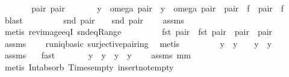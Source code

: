 \begin{isabellebody}
\ \ \ \ \isamarkupfalse%
\ \isamarkupfalse%
\ pair{}\ pair{}\ \ \isanewline
\ \ \ \ {}{\isacharcolon}\ {\isachardoublequoteopen}y{}\ {\isacharequal}\ omega\ pair{}\ {\isacharampersand}\ y{}\ {\isacharequal}\ omega\ pair{}\ {\isacharampersand}\ pair{}\ {\isasymin}\ f\ {\isacharampersand}\ pair{}\ {\isasymin}\ f{\isachardoublequoteclose}\ \isamarkupfalse%
\ blast\isanewline
\ \ \ \ \isamarkupfalse%
\ \isamarkupfalse%
\ \isamarkupfalse%
\ {\isachardoublequoteopen}snd\ pair{}\ {\isasymnoteq}\ {\isacharbraceleft}{\isacharbraceright}\ {\isacharampersand}\ snd\ pair{}\ {\isasymnoteq}\ {\isacharbraceleft}{\isacharbraceright}{\isachardoublequoteclose}\ \isamarkupfalse%
\ assms\isanewline
{}\isamarkupfalse%
\ {\isacharparenleft}metis\ rev{\isacharunderscore}image{\isacharunderscore}eqI\ snd{\isacharunderscore}eq{\isacharunderscore}Range{\isacharparenright}\isanewline
\ \ \ \ \isamarkupfalse%
\ \isamarkupfalse%
\ \isamarkupfalse%
\ {\isachardoublequoteopen}fst\ pair{}\ {\isacharequal}\ fst\ pair{}\ {\isasymlongleftrightarrow}\ pair{}\ {\isacharequal}\ pair{}{\isachardoublequoteclose}\ \isamarkupfalse%
\ assms\isanewline
\ \ \ \ runiq{\isacharunderscore}basic\ surjective{\isacharunderscore}pairing\ \isamarkupfalse%
\ metis\isanewline
\ \ \ \ \isamarkupfalse%
\ \isamarkupfalse%
\ \isamarkupfalse%
\ {\isachardoublequoteopen}y{}\ {\isasyminter}\ y{}\ {\isasymnoteq}\ {\isacharbraceleft}{\isacharbraceright}\ {\isasymlongrightarrow}\ y{}\ {\isacharequal}\ y{}{\isachardoublequoteclose}\ \isamarkupfalse%
\ assms\ {}\ \isamarkupfalse%
\ fast\isanewline
\ \ \ \ \isamarkupfalse%
\ \isamarkupfalse%
\ {\isachardoublequoteopen}y{}\ {\isacharequal}\ y{}\ {\isasymlongleftrightarrow}\ y{}\ {\isasyminter}\ y{}\ {\isasymnoteq}\ {\isacharbraceleft}{\isacharbraceright}{\isachardoublequoteclose}\ \isamarkupfalse%
\ assms\ mm{}{}\ \isanewline
\ \ \ \ \isamarkupfalse%
\ {\isacharparenleft}metis\ Int{\isacharunderscore}absorb\ Times{\isacharunderscore}empty\ insert{\isacharunderscore}not{\isacharunderscore}empty{\isacharparenright}\isanewline

\end{isabellebody}
